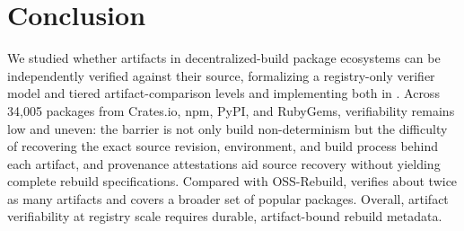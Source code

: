 \section{Conclusion}
We studied whether artifacts in decentralized-build package ecosystems can be independently verified against their source, formalizing a registry-only verifier model and tiered artifact-comparison levels and implementing both in \toolname. Across 34{,}005 packages from Crates.io, npm, PyPI, and RubyGems, verifiability remains low and uneven: the barrier is not only build non-determinism but the difficulty of recovering the exact source revision, environment, and build process behind each artifact, and provenance attestations aid source recovery without yielding complete rebuild specifications. Compared with OSS-Rebuild, \toolname verifies about twice as many artifacts and covers a broader set of popular packages. Overall, artifact verifiability at registry scale requires durable, artifact-bound rebuild metadata.

